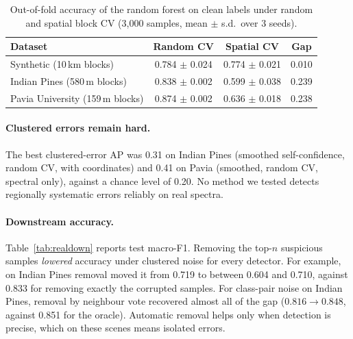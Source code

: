 \documentclass[11pt]{article}
\begin{document}
\begin{table}[t]
\centering\small
\caption{Out-of-fold accuracy of the random forest on clean labels under random
and spatial block CV (3{,}000 samples, mean $\pm$ s.d.\ over 3 seeds).}
\label{tab:transfer}
\begin{tabular}{lccc}
\toprule
Dataset & Random CV & Spatial CV & Gap \\
\midrule
Synthetic (10\,km blocks) & 0.784 $\pm$ 0.024 & 0.774 $\pm$ 0.021 & 0.010 \\
Indian Pines (580\,m blocks) & 0.838 $\pm$ 0.002 & 0.599 $\pm$ 0.038 & 0.239 \\
Pavia University (159\,m blocks) & 0.874 $\pm$ 0.002 & 0.636 $\pm$ 0.018 & 0.238 \\
\bottomrule
\end{tabular}
\end{table}

\paragraph{Clustered errors remain hard.}
The best clustered-error AP was 0.31 on Indian Pines (smoothed self-confidence,
random CV, with coordinates) and 0.41 on Pavia (smoothed, random CV, spectral
only), against a chance level of 0.20. No method we tested detects regionally
systematic errors reliably on real spectra.

\paragraph{Downstream accuracy.}
Table~\ref{tab:realdown} reports test macro-F1. Removing the top-$n$ suspicious
samples \emph{lowered} accuracy under clustered noise for every detector. For
example, on Indian Pines removal moved it from 0.719 to between 0.604 and 0.710,
against 0.833 for removing exactly the corrupted samples. For class-pair noise on
Indian Pines, removal by neighbour vote recovered almost all of the gap
($0.816\to0.848$, against 0.851 for the oracle). Automatic removal helps only
when detection is precise, which on these scenes means isolated errors.

\begin{table}[t]
\centering\small
\caption{Test macro-F1 on clean labels after removing the top-$n$ suspicious
training samples on the real scenes ($n$ = true error count, 20\% error rate,
spectral features, mean $\pm$ s.d.\ over 5 seeds).}
\label{tab:realdown}
\resizebox{\linewidth}{!}{}
\end{table}
\end{document}
